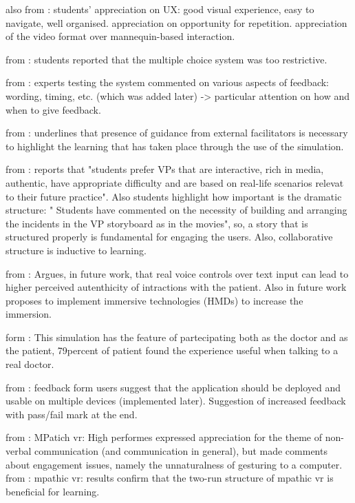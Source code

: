 also from \cite{peddle2019exploring}: students' appreciation on UX: good visual experience, easy to navigate, well organised. appreciation on opportunity for repetition. appreciation of the video format over mannequin-based interaction. 

from \cite{jacklin2019virtual}: students reported that the multiple choice system was too restrictive. 

from \cite{jacklin2018improving}: experts testing the system commented on various aspects of feedback: wording, timing, etc. (which was added later) -> particular attention on how and when to give feedback.

from \cite{adefila2020students}: underlines that presence of guidance from external facilitators is necessary to highlight the learning that has taken place through the use of the simulation.

from \cite{marei2018use}: reports that "students prefer VPs that are interactive, rich in media, authentic, have appropriate difficulty and are based on real-life scenarios relevat to their future practice". Also students highlight how important is the dramatic structure: " Students have commented on the necessity of building and arranging the incidents in the VP storyboard as in the movies", so, a story that is structured properly is fundamental for engaging the users. 
Also, collaborative structure is inductive to learning.

from \cite{washburn2020virtual}: Argues, in future work, that real voice controls over text input can lead to higher perceived autenthicity of intractions with the patient. Also in future work proposes to implement immersive technologies (HMDs) to increase the immersion. 

form \cite{schoenthaler2017simulated}: This simulation has the feature of partecipating both as the doctor and as the patient, 79percent of patient found the experience useful when talking to a real doctor. 

from \cite{richardson2019virtual}: feedback form users suggest that the application should be deployed and usable on multiple devices (implemented later). Suggestion of increased feedback with pass/fail mark at the end. 

from \cite{guetterman2019medical}: MPatich vr: High performes expressed appreciation for the theme of non-verbal communication (and communication in general), but made comments about engagement issues, namely the unnaturalness of gesturing to a computer.
from \cite{kron2017using}: mpathic vr: results confirm that the two-run structure of mpathic vr is beneficial for learning.


